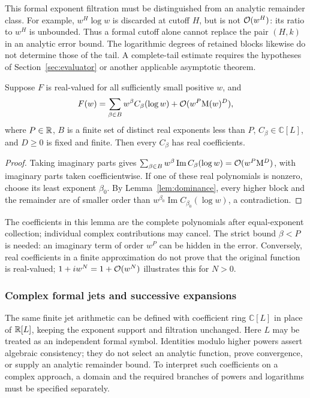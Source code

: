 This formal exponent filtration must be distinguished from an analytic
remainder class. For example, $w^H\log w$ is discarded at cutoff $H$,
but is not $\mathcal O(w^H)$: its ratio to $w^H$ is unbounded. Thus a formal
cutoff alone cannot replace the pair $(H,k)$ in an analytic error bound.
The logarithmic degrees of retained blocks likewise do not determine
those of the tail. A complete-tail estimate requires the hypotheses of
Section~\ref{sec:evaluator} or another applicable asymptotic theorem.

\begin{lemma}
\label{lem:real-resolved-coefficients}
Suppose $F$ is real-valued for all sufficiently small positive $w$, and
\[
 F(w)=\sum_{\beta\in B}w^\beta C_\beta(\log w)
       +\mathcal O(w^P\mathrm M(w)^D),
\]
where $P\in\mathbb R$, $B$ is a finite set of distinct real exponents less than $P$,
$C_\beta\in\mathbb C[L]$, and $D\ge0$ is fixed and finite.
Then every $C_\beta$ has real coefficients.
\end{lemma}
\begin{proof}
Taking imaginary parts gives
$\sum_{\beta\in B}w^\beta\operatorname{Im}C_\beta(\log w)
=\mathcal O(w^P\mathrm M^D)$, with imaginary parts taken coefficientwise.
If one of these real polynomials is nonzero, choose its least exponent
$\beta_0$. By Lemma~\ref{lem:dominance}, every higher block and the
remainder are of smaller order than
$w^{\beta_0}\operatorname{Im}C_{\beta_0}(\log w)$, a contradiction.
\end{proof}

The coefficients in this lemma are the complete polynomials after
equal-exponent collection; individual complex contributions may cancel.
The strict bound $\beta<P$ is needed: an imaginary term of order $w^P$
can be hidden in the error. Conversely, real coefficients in a finite
approximation do not prove that the original function is real-valued;
$1+i w^N=1+\mathcal O(w^N)$ illustrates this for $N>0$.

\subsubsection*{Complex formal jets and successive expansions}
\label{sec:formal-successive-jets}

The same finite jet arithmetic can be defined with coefficient ring
$\mathbb C[L]$ in place of $\mathbb R[L]$, keeping the exponent support and
filtration unchanged. Here $L$ may be treated as an independent formal
symbol. Identities modulo higher powers assert algebraic consistency;
they do not select an analytic function, prove convergence, or supply an
analytic remainder bound. To interpret such coefficients on a complex
approach, a domain and the required branches of powers and logarithms
must be specified separately.

